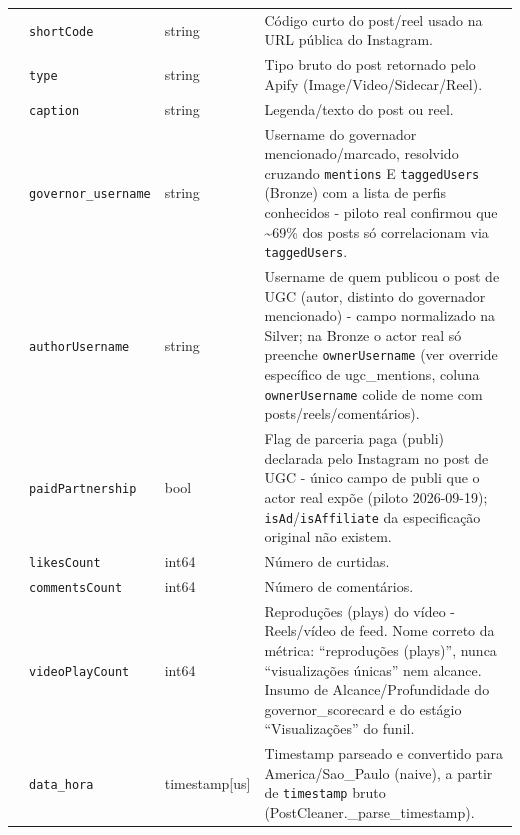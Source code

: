 \begin{footnotesize}
\begin{longtable}{p{3.2cm}p{3.0cm}p{2.0cm}p{6.0cm}}
\texttt{} & \texttt{shortCode} & string & Código curto do post/\allowbreak{}reel usado na URL pública do Instagram. \\
\texttt{} & \texttt{type} & string & Tipo bruto do post retornado pelo Apify (Image/\allowbreak{}Video/\allowbreak{}Sidecar/\allowbreak{}Reel). \\
\texttt{} & \texttt{caption} & string & Legenda/\allowbreak{}texto do post ou reel. \\
\texttt{} & \texttt{governor\_\allowbreak{}username} & string & Username do governador mencionado/\allowbreak{}marcado, resolvido cruzando \texttt{mentions} E \texttt{taggedUsers} (Bronze) com a lista de perfis conhecidos - piloto real confirmou que \textasciitilde{}69\% dos posts só correlacionam via \texttt{taggedUsers}. \\
\texttt{} & \texttt{authorUsername} & string & Username de quem publicou o post de UGC (autor, distinto do governador mencionado) - campo normalizado na Silver; na Bronze o actor real só preenche \texttt{ownerUsername} (ver override específico de ugc\_\allowbreak{}mentions, coluna \texttt{ownerUsername} colide de nome com posts/\allowbreak{}reels/\allowbreak{}comentários). \\
\texttt{} & \texttt{paidPartnership} & bool & Flag de parceria paga (publi) declarada pelo Instagram no post de UGC - único campo de publi que o actor real expõe (piloto 2026-09-19); \texttt{isAd}/\allowbreak{}\texttt{isAffiliate} da especificação original não existem. \\
\texttt{} & \texttt{likesCount} & int64 & Número de curtidas. \\
\texttt{} & \texttt{commentsCount} & int64 & Número de comentários. \\
\texttt{} & \texttt{videoPlayCount} & int64 & Reproduções (plays) do vídeo - Reels/\allowbreak{}vídeo de feed. Nome correto da métrica: ``reproduções (plays)'', nunca ``visualizações únicas'' nem alcance. Insumo de Alcance/\allowbreak{}Profundidade do governor\_\allowbreak{}scorecard e do estágio ``Visualizações'' do funil. \\
\texttt{} & \texttt{data\_\allowbreak{}hora} & timestamp[us] & Timestamp parseado e convertido para America/\allowbreak{}Sao\_\allowbreak{}Paulo (naive), a partir de \texttt{timestamp} bruto (PostCleaner.\_\allowbreak{}parse\_\allowbreak{}timestamp). \\
\end{longtable}
\end{footnotesize}

